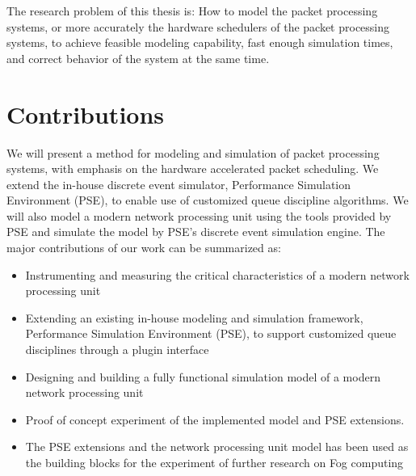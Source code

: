 

The research problem of this thesis is: How to model the packet processing systems, or more accurately the hardware schedulers of the packet processing systems, to achieve feasible modeling capability, fast enough simulation times, and correct behavior of the system at the same time.

\section{Contributions}
We will present a method for modeling and simulation of packet processing systems, with emphasis on the hardware accelerated packet scheduling. We extend the in-house discrete event simulator, Performance Simulation Environment (PSE), to enable use of customized queue discipline algorithms. We will also model a modern network processing unit using the tools provided by PSE and simulate the model by PSE's discrete event simulation engine. The major contributions of our work can be summarized as:



\begin{itemize}
\item Instrumenting and measuring the critical characteristics of a modern network processing unit
\item Extending an existing in-house modeling and simulation framework, Performance Simulation Environment (PSE), to support customized queue disciplines through a plugin interface %
\item Designing and building a fully functional simulation model of a modern network processing unit

\item Proof of concept experiment of the implemented model and PSE extensions.

\item The PSE extensions and the network processing unit model has been used as the building blocks for the experiment of further research on Fog computing
\end{itemize}


